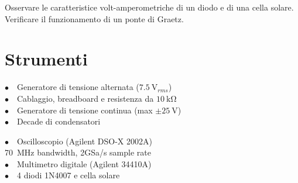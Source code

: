 Osservare le caratteristice volt-amperometriche di un diodo e di una cella solare. Verificare il funzionamento di un ponte di Graetz.

\section{Strumenti}
%
\phantom{porcodio!}
\noindent
\begin{minipage}{.5\linewidth}
$\bullet \quad$Generatore di tensione alternata ($\SI{7.5}{\volt}_{rms}$)\\
$\bullet \quad$Cablaggio, breadboard e resistenza da $\SI{10}{\kilo\ohm}$\\
$\bullet \quad$Generatore di tensione continua (max $\pm \SI{25}{\volt}$)\\
$\bullet \quad$Decade di condensatori
\end{minipage}%
\begin{minipage}{.5\linewidth}
$\bullet \quad$Oscilloscopio (Agilent DSO-X 2002A)\\
\phantom{xxxx}\SI{70}{\mega\hertz} bandwidth, 2GSa/s sample rate\\
$\bullet \quad$Multimetro digitale (Agilent 34410A)\\
$\bullet \quad$4 diodi 1N4007 e cella solare
\end{minipage}